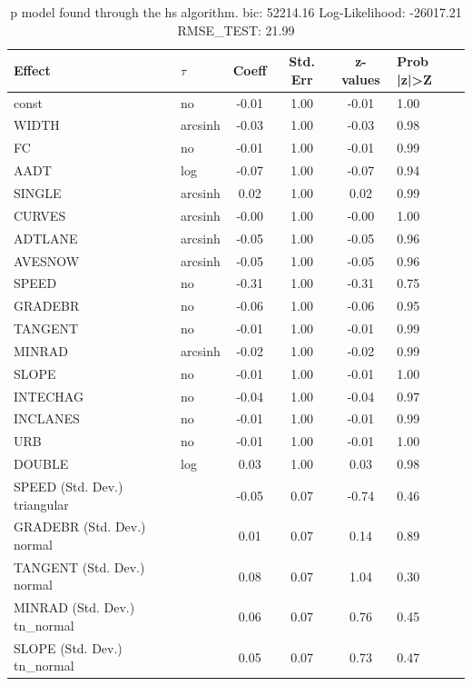 \begin{table}
	\caption{p model found through the hs algorithm. bic: 52214.16 Log-Likelihood: -26017.21 RMSE_TEST: 21.99}
	\begin{center}
		\begin{tabular}{|l|l|c|c|c|l|}
			\hline
			Effect & $\tau$ & Coeff & Std. Err & z-values & Prob |z|>Z \\
			\hline
			const & no & -0.01 & 1.00 & -0.01 & 1.00 \\
			\hline
			WIDTH & arcsinh & -0.03 & 1.00 & -0.03 & 0.98 \\
			\hline
			FC & no & -0.01 & 1.00 & -0.01 & 0.99 \\
			\hline
			AADT & log & -0.07 & 1.00 & -0.07 & 0.94 \\
			\hline
			SINGLE & arcsinh & 0.02 & 1.00 & 0.02 & 0.99 \\
			\hline
			CURVES & arcsinh & -0.00 & 1.00 & -0.00 & 1.00 \\
			\hline
			ADTLANE & arcsinh & -0.05 & 1.00 & -0.05 & 0.96 \\
			\hline
			AVESNOW & arcsinh & -0.05 & 1.00 & -0.05 & 0.96 \\
			\hline
			SPEED & no & -0.31 & 1.00 & -0.31 & 0.75 \\
			\hline
			GRADEBR & no & -0.06 & 1.00 & -0.06 & 0.95 \\
			\hline
			TANGENT & no & -0.01 & 1.00 & -0.01 & 0.99 \\
			\hline
			MINRAD & arcsinh & -0.02 & 1.00 & -0.02 & 0.99 \\
			\hline
			SLOPE & no & -0.01 & 1.00 & -0.01 & 1.00 \\
			\hline
			INTECHAG & no & -0.04 & 1.00 & -0.04 & 0.97 \\
			\hline
			INCLANES & no & -0.01 & 1.00 & -0.01 & 0.99 \\
			\hline
			URB & no & -0.01 & 1.00 & -0.01 & 1.00 \\
			\hline
			DOUBLE & log & 0.03 & 1.00 & 0.03 & 0.98 \\
			\hline
			SPEED (Std. Dev.) triangular &  & -0.05 & 0.07 & -0.74 & 0.46 \\
			\hline
			GRADEBR (Std. Dev.) normal &  & 0.01 & 0.07 & 0.14 & 0.89 \\
			\hline
			TANGENT (Std. Dev.) normal &  & 0.08 & 0.07 & 1.04 & 0.30 \\
			\hline
			MINRAD (Std. Dev.) tn_normal &  & 0.06 & 0.07 & 0.76 & 0.45 \\
			\hline
			SLOPE (Std. Dev.) tn_normal &  & 0.05 & 0.07 & 0.73 & 0.47 \\

\end{tabular}
\end{center}
\end{table}
